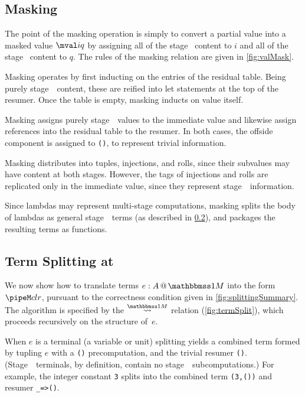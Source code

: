 \begin{abstrsyn}
\subsection{Masking}

The point of the masking operation is simply to convert a partial value into a masked value $\mval i q$
by assigning all of the stage \bbone\ content to $i$ and all of the stage \bbtwo\ content to $q$.
The rules of the masking relation are given in \ref{fig:valMask}.

Masking operates by first inducting on the entries of the residual table.  
Being purely stage~\bbtwo\ content, these are reified into let statements at the top of the resumer.
Once the table is empty, masking inducts on value itself.

Masking assigns purely stage~\bbone\ values to the immediate value
and likewise assign references into the residual table to the resumer.
In both cases, the offside component is assigned to \texttt{()}, to represent trivial information.

Masking distributes into tuples, injections, and rolls, since their subvalues may have content at both stages.
However, the tags of injections and rolls are replicated only in the immediate value, 
since they represent stage~\bbone\ information.

Since lambdas may represent multi-stage computations, 
masking splits the body of lambdas as general stage~\bbone\ terms (as described in \ref{sec:split-one}), 
and packages the resulting terms as functions.

\subsection{Term Splitting at \bbonem}
\label{sec:split-one}

We now show how to translate terms $\colmix e A$ into the form $\pipeM c l r$,
pursuant to the correctness condition given in \ref{fig:splittingSummary}.
The algorithm is specified by the $\splitonesym$ relation (\cref{fig:termSplit}), 
which proceeds recursively on the structure of~$e$.

When $e$ is a terminal (a variable or unit)
splitting yields a combined term formed by tupling $e$ with a \texttt{()} precomputation, 
and the trivial resumer \texttt{()}. 
(Stage~\bbone\ terminals, by definition, contain no stage~\bbtwo\ subcomputations.)  
For example, the integer constant \texttt{3} splits into the combined term \texttt{(3,())} and resumer \texttt{\_=>()}.


\end{abstrsyn}
